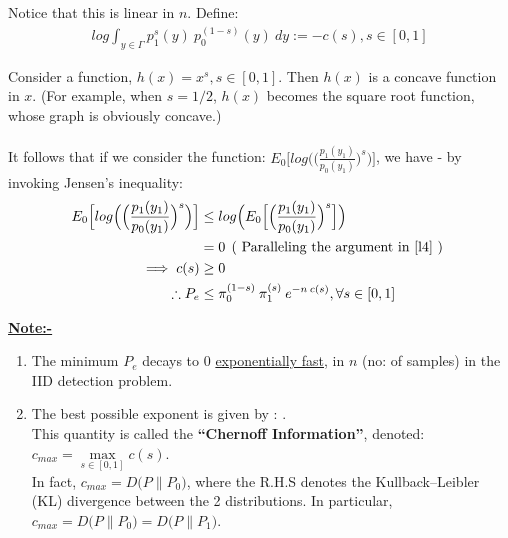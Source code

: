 \documentclass[12pt]{report}
\begin{document}
\noindent  Notice that this is linear in $n$. Define: \\
                 \begin{align}
                       log  \int_{y \in \Gamma} p_1^{s}(y) \: p_0^{(1-s)}(y) \: dy := -c(s), s \in [0,1] 
                  \end{align}

\noindent    Consider a function, $h(x) = x^{s}, s \in [0,1] $. Then $h(x)$ is  a concave function in $x$. (For example, when $ s = 1/2 $, $h(x)$ becomes the square root function, whose graph is obviously concave.)\\\\

             
\noindent  It follows that if we consider the function: $  E_0 \Big[ log  \Big( \Big( \frac{ p_1(y_1)}{ p_0(y_1)} \Big)^{s}  \Big) \Big] $, we have - by invoking Jensen's inequality: \\

              \begin{align}
                      E_0 \Big[ log  \Big( \Big( \frac{ p_1(y_1)}{ p_0(y_1)} \Big)^{s}  \Big) \Big]  &\leq   log \Big(  E_0\Big[ \Big( \frac{ p_1(y_1)}{ p_0(y_1)} \Big)^{s}  \Big] \Big) \nonumber \\
                                                                                                                                              &= 0 \:\: \text {( Paralleling the argument in \ref{l4} )  } \nonumber \\
                                                                                                                                \implies c(s) &\geq 0 \\
                     \therefore P_e &\leq \pi_0^{(1-s)} \: \pi_1^{(s)} \: e^{-n \: c(s)}, \forall s \in [0,1]
              \end{align}


\noindent \textbf{\underline{Note:-}}


\begin{enumerate}
  \item The minimum $ P_e $ decays to 0 \underline{exponentially fast}, in $n$ (no: of samples) in the IID detection problem.
  \item The best possible exponent is given by :  .\\
\noindent This quantity is called the \textbf{``Chernoff Information''}, denoted: $c_{max}  = \max\limits_{s \in [0,1]} c(s)$. \\
\noindent In fact,   $c_{max}  = D\Big( P \parallel P_0   \Big) $, where the R.H.S denotes the Kullback--Leibler (KL) divergence between the 2 distributions. In particular,   $c_{max}  = D\Big( P \parallel P_0   \Big)  =   D\Big( P \parallel P_1   \Big)$. \\
\end{enumerate}
\end{document}
